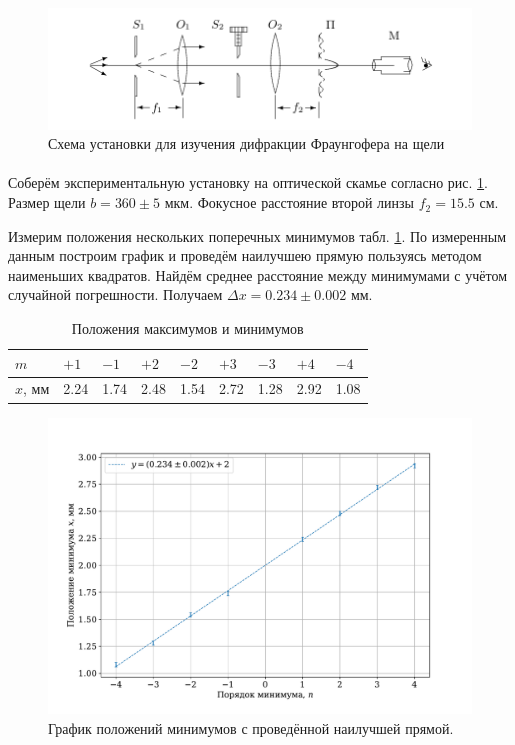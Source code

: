 \documentclass[a4paper,12pt]{article} %
\begin{document}
\begin{figure}[h]
\centering
\includegraphics[width=\textwidth]{setup2.png}
\caption{Схема установки для изучения дифракции Фраунгофера на щели}
\label{fig:setup2}
\end{figure}

\paragraph{} Соберём экспериментальную установку на оптической скамье согласно рис. \ref{fig:setup2}. Размер щели $b = 360 \pm 5$ мкм. Фокусное расстояние второй линзы $f_2 = 15.5$ см.

Измерим положения нескольких поперечных минимумов табл. \ref{tab:exp2}. По измеренным данным построим график и проведём наилучшею прямую пользуясь методом наименьших квадратов. Найдём среднее расстояние между минимумами с учётом случайной погрешности. Получаем $\Delta x = 0.234 \pm 0.002$ мм.

\begin{table}[h]
\centering
\begin{tabular}{|l|l|l|l|l|l|l|l|l|}
\hline
$m$     & $+1$ & $-1$ & $+2$ & $-2$ & $+3$ & $-3$ & $+4$ & $-4$ \\ \hline
$x$, мм & 2.24 & 1.74 & 2.48 & 1.54 & 2.72 & 1.28 & 2.92 & 1.08 \\ \hline
\end{tabular}
\caption{Положения максимумов и минимумов}
\label{tab:exp2}
\end{table}


\begin{figure}
\centering
\includegraphics[width=\textwidth]{exp2.pdf}
\caption{График положений минимумов с проведённой наилучшей прямой.}
\label{fig:exp2}
\end{figure}
\end{document}

